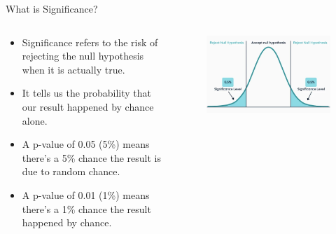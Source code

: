 \documentclass[
  ignorenonframetext,
]{beamer}
\providecommand{\tightlist}{%
  \setlength{\itemsep}{0pt}\setlength{\parskip}{0pt}}
\begin{document}
\begin{frame}{What is Significance?}
\label{what-is-significance-1}
\begin{columns}[T]
\begin{column}{0.5\textwidth}
\begin{itemize}
\tightlist
\item
  Significance refers to the risk of rejecting the null hypothesis when
  it is actually true.
\end{itemize}

\begin{itemize}
\tightlist
\item
  It tells us the probability that our result happened by chance alone.
\end{itemize}

\begin{itemize}
\tightlist
\item
  A p-value of 0.05 (5\%) means there's a 5\% chance the result is due
  to random chance.
\end{itemize}

\begin{itemize}
\tightlist
\item
  A p-value of 0.01 (1\%) means there's a 1\% chance the result happened
  by chance.
\end{itemize}
\end{column}

\begin{column}{0.5\textwidth}
\vspace{1.5cm}
\begin{figure}

{\centering \includegraphics[width=0.7\linewidth]{figs/significance} 

}

\end{figure}
\end{column}
\end{columns}
\end{frame}
\end{document}
